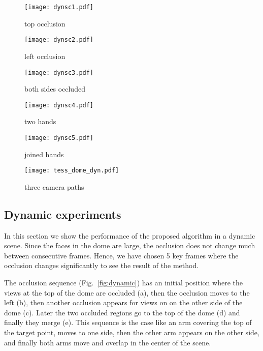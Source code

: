\documentclass[10pt,twocolumn,letterpaper]{article}
\begin{document}
\begin{figure*}[!ht]
\begin{center}
\begin{subfigure}[b]{.3\textwidth} \centering
\texttt{[image: dynsc1.pdf]}
        \caption{top occlusion}
        \label{fig:dynamic1}
\end{subfigure}
\begin{subfigure}[b]{.3\textwidth} \centering
\texttt{[image: dynsc2.pdf]}
        \caption{left occlusion}
        \label{fig:dynamic2}
\end{subfigure}
\begin{subfigure}[b]{.3\textwidth} \centering
\texttt{[image: dynsc3.pdf]}
        \caption{both sides occluded}
        \label{fig:dynamic3}
\end{subfigure}
\begin{subfigure}[b]{.3\textwidth} \centering
\texttt{[image: dynsc4.pdf]}
        \caption{two hands}
        \label{fig:dynamic4}
\end{subfigure}
\begin{subfigure}[b]{.3\textwidth} \centering
\texttt{[image: dynsc5.pdf]}
        \caption{joined hands}
        \label{fig:dynamic5}
\end{subfigure}
\begin{subfigure}[b]{.3\textwidth} \centering
\texttt{[image: tess\_dome\_dyn.pdf]}
        \caption{three camera paths}
        \label{fig:dynamic-camera-paths}
\end{subfigure}
\end{center}
  \caption{Dynamic scene with moving obstacles. (a-e) show the occlusion projected on the dome (purple: occluded viewpoints, yellow: not occluded). (f) shows the camera trajectories for different starting positions.}
\label{fig:dynamic}
\end{figure*}

\subsection{Dynamic experiments}
In this section we show the performance of the proposed algorithm in a dynamic scene. 
Since the faces in the dome are large, the occlusion does not change much between consecutive frames. 
Hence, we have chosen 5 key frames where the occlusion changes significantly to see the result of the method.

The occlusion sequence (Fig.~\ref{fig:dynamic}) has an initial position where the views at the top of the dome are occluded (a), then the occlusion moves to the left (b), then another occlusion appears for views on on the other side of the dome (c). Later the two occluded regions go to the top of the dome (d) and finally they merge (e). 
This sequence is the case like an arm covering the top of the target point, moves to one side, then the other arm appears on the other side, and finally both arms move and overlap in the center of the scene.
\end{document}
